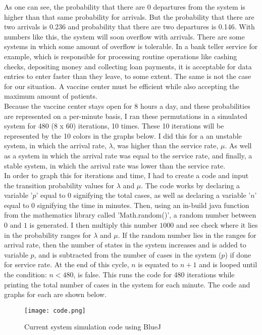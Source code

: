 \documentclass[11pt]{article}
\begin{document}
As one can see, the probability that there are 0 departures from the system is higher than that same probability for arrivals. But the probability that there are two arrivals is 0.236 and probability that there are two departures is 0.146. With numbers like this, the system will soon overflow with arrivals. There are some systems in which some amount of overflow is tolerable. In a bank teller service for example, which is responsible for processing routine operations like cashing checks, depositing money and collecting loan payments, it is acceptable for data entries to enter faster than they leave, to some extent. The same is not the case for our situation. A vaccine center must be efficient while also accepting the maximum amount of patients.\\ Because the vaccine center stays open for 8 hours a day, and these probabilities are represented on a per-minute basis, I ran these permutations in a simulated system for 480 (8 x 60) iterations, 10 times. These 10 iterations will be represented by the 10 colors in the graphs below. I did this for a an unstable system, in which the arrival rate, $\lambda$, was higher than the service rate, $\mu$. As well as a system in which the arrival rate was equal to the service rate, and finally, a stable system, in which the arrival rate was lower than the service rate. \\In order to graph this for iterations and time, I had to create a code and input the transition probability values for $\lambda$ and $\mu$. The code works by declaring a variable '$p$' equal to $0$ signifying the total cases, as well as declaring a variable '$n$' equal to $0$ signifying the time in minutes. Then, using an in-build java function from the mathematics library called 'Math.random()', a random number between $0$ and $1$ is generated. I then multiply this number $1000$ and see check where it lies in the probability ranges for $\lambda$ and $\mu$. If the random number lies in the ranges for arrival rate, then the number of states in the system increases and is added to variable $p$, and is subtracted from the number of cases in the system ($p$) if done for service rate. At the end of this cycle, $n$ is equated to $n+1$ and is looped until the condition: $n<480$, is false. This runs the code for 480 iterations while printing the total number of cases in the system for each minute. The code and graphs for each are shown below.

\FloatBarrier
\begin{figure}[h!]
    \centering
    \texttt{[image: code.png]}
    \caption{Current system simulation code using BlueJ}
    \label{unstable}
\end{figure}
\end{document}
